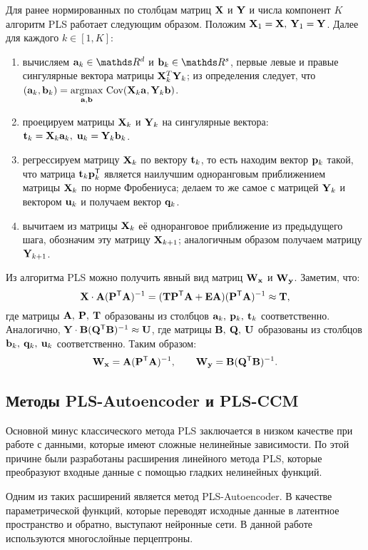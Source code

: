 \documentclass[a4paper, 12pt]{article}
\begin{document}
Для ранее нормированных по столбцам матриц $\mathbf{X}$ и $\mathbf{Y}$ и числа компонент $K$ алгоритм PLS работает следующим образом. 
Положим $\mathbf{X}_1 = \mathbf{X}, \: \mathbf{Y}_1 = \mathbf{Y}$. 
Далее для каждого $k \in [1, K]$:
\begin{enumerate}
	\item вычисляем $\ba_k \in \dR^d$ и $\bb_k \in \dR^s$, первые левые и правые сингулярные вектора матрицы $\mathbf{X}_k^T \mathbf{Y}_k$; из определения следует, что $(\mathbf{a}_k, \mathbf{b}_k) = \underset{\mathbf{a}, \mathbf{b}}{\text{argmax}} \text{ Cov} (\mathbf{X}_k \mathbf{a}, \mathbf{Y}_k \mathbf{b})$.
	\item проецируем матрицы $\mathbf{X}_k$ и $\mathbf{Y}_k$ на сингулярные вектора: $\mathbf{t}_k = \mathbf{X}_k \mathbf{a}_k, \; \mathbf{u}_k = \mathbf{Y}_k \mathbf{b}_k$.
	\item регрессируем матрицу $\mathbf{X}_k$ по вектору $\mathbf{t}_k$, то есть находим вектор $\mathbf{p}_k$ такой, что матрица $\mathbf{t}_k \mathbf{p}_k^{\mathsf{T}}$ является наилучшим одноранговым приближением матрицы $\mathbf{X}_k$ по норме Фробениуса; делаем то же самое с матрицей $\mathbf{Y}_k$ и вектором $\mathbf{u}_k$ и получаем вектор $\mathbf{q}_k$.
	\item вычитаем из матрицы $\mathbf{X}_k$ её одноранговое приближение из предыдущего шага, обозначим эту матрицу $\mathbf{X}_{k+1}$; аналогичным образом получаем матрицу $\mathbf{Y}_{k+1}$.
\end{enumerate}

Из алгоритма PLS можно получить явный вид матриц $\mathbf{W}_{\mathbf{x}}$ и $\mathbf{W}_{\mathbf{y}}$. Заметим, что:
$$ \mathbf{X} \cdot \mathbf{A}(\mathbf{P} ^{\mathsf{T}} \mathbf{A})^{-1} = (\mathbf{T} \mathbf{P} ^{\mathsf{T}} \mathbf{A} + \mathbf{E} \mathbf{A})(\mathbf{P} ^{\mathsf{T}} \mathbf{A})^{-1} \approx \mathbf{T}, $$
где матрицы $\mathbf{A}, \: \mathbf{P}, \: \mathbf{T}$ образованы из столбцов $\mathbf{a}_k, \: \mathbf{p}_k, \: \mathbf{t}_k$ соответственно. Аналогично, $\mathbf{Y} \cdot \mathbf{B}(\mathbf{Q} ^{\mathsf{T}} \mathbf{B})^{-1} \approx \mathbf{U}$, где матрицы $\mathbf{B}, \: \mathbf{Q}, \: \mathbf{U}$ образованы из столбцов $\mathbf{b}_k, \: \mathbf{q}_k, \: \mathbf{u}_k$ соответственно. 
Таким образом:
$$ \mathbf{W}_{\mathbf{x}} = \mathbf{A}(\mathbf{P} ^{\mathsf{T}} \mathbf{A})^{-1}, \qquad \mathbf{W}_{\mathbf{y}} = \mathbf{B}(\mathbf{Q} ^{\mathsf{T}} \mathbf{B})^{-1}. $$

\subsection{Методы PLS-Autoencoder и PLS-CCM}
Основной минус классического метода PLS заключается в низком качестве при работе с данными, которые имеют сложные нелинейные зависимости. 
По этой причине были разработаны расширения линейного метода PLS, которые преобразуют входные данные с помощью гладких нелинейных функций.
 
Одним из таких расширений является метод PLS-Autoencoder. 
В качестве параметрической функций, которые переводят исходные данные в латентное пространство и обратно, выступают нейронные сети.
В данной работе используются многослойные перцептроны.
\end{document}
